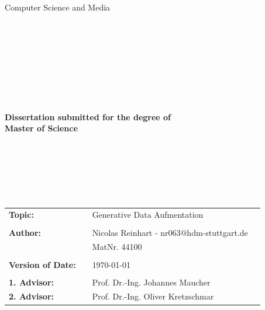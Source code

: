\begin{center}
\Large{Computer Science and Media}\\
\end{center}
\begin{verbatim}




\end{verbatim}
\begin{center}
\doublespacing
\textbf{\LARGE{\titleDocument}}\\
\singlespacing
\begin{verbatim}

\end{verbatim}
\textbf{{~\subjectDocument}}
\end{center}
\begin{center}
\textbf{Dissertation submitted for the degree of \\ Master of Science}
\end{center}
\begin{verbatim}






\end{verbatim}
\begin{flushleft}
\begin{tabular}{llll}
\textbf{Topic:} & & Generative Data Aufmentation & \\
& &  \\
\textbf{Author:} & & Nicolas Reinhart - nr063@hdm-stuttgart.de& \\
& & MatNr. 44100 & \\
& & \\
\textbf{Version of Date:} & & \today &\\
& & \\
\textbf{1. Advisor:} & & Prof. Dr.-Ing. Johannes Maucher &\\
\textbf{2. Advisor:} & & Prof. Dr.-Ing. Oliver Kretzschmar &\\
\end{tabular}
\end{flushleft}
